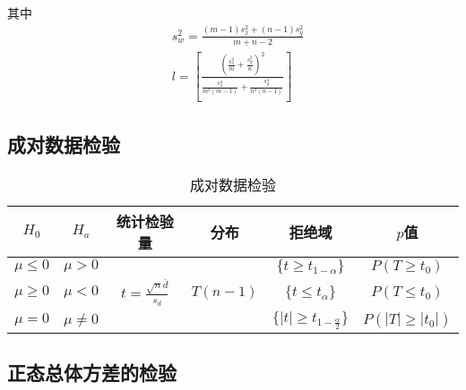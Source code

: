 \documentclass[lang = cn, scheme = chinese, thmcnt = section]{elegantbook}
\begin{document}
其中
\begin{align*}
	& s_w^2=\frac{(m-1)s_x^2+(n-1)s_y^2}{m+n-2}\\
	& l=\left[ \frac{\left(\frac{s_x^2}{m}+\frac{s_y^2}{n}\right)^2}{\frac{s_x^4}{m^2(m-1)}+\frac{s_y^4}{n^2(n-1)}} \right]
\end{align*}

\subsection{成对数据检验}

\begin{table}[H]
	\centering
	\caption{成对数据检验}
	\renewcommand{\arraystretch}{1.5}
	\begin{tabular}{|c|c|c|c|c|c|}
		\hline
		$H_0$ & $H_a$ & 统计检验量 & 分布 & 拒绝域 & $p$值 \\ \hline
		$\mu\le 0$ & $\mu>0$ &  &  & $\{ t\ge t_{1-\alpha} \}$ & $P(T\ge t_0)$ \\ \hline
		$\mu\ge 0$ & $\mu<0$ & $t=\frac{\sqrt{n}\overline{d}}{s_d}$ & $T(n-1)$ & $\{ t\le t_{\alpha} \}$ & $P(T\le t_0)$ \\ \hline
		$\mu=0$ & $\mu\ne 0$ &  &  & $\{|t|\ge t_{1-\frac{\alpha}{2}}\}$ & $P(|T|\ge |t_0|)$ \\ \hline
	\end{tabular}
\end{table}

\subsection{正态总体方差的检验}
\end{document}
